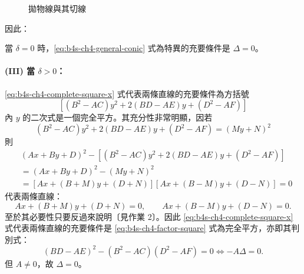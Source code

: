 \begin{figure}[htbp]
\centering
{}
\caption{拋物線與其切線}
\label{fig:b4s-ch4-fig1-2}
\end{figure}

因此：
\begin{proposition}
當 $\delta = 0$ 時，\eqref{eq:b4s-ch4-general-conic} 式為特異的充要條件是 $\Delta = 0$。
\end{proposition}

\paragraph*{(III) 當 $\delta > 0$：}
\eqref{eq:b4s-ch4-complete-square-x} 式代表兩條直線的充要條件為方括號
\[
[(B^2 - AC)y^2 + 2(BD - AE)y + (D^2 - AF)]
\]
內 $y$ 的二次式是一個完全平方。其充分性非常明顯，因若
\begin{equation}
(B^2 - AC)y^2 + 2(BD - AE)y + (D^2 - AF) = (My + N)^2
\label{eq:b4s-ch4-factor-square}
\end{equation}
則
\[
\begin{aligned}
&(Ax + By + D)^2 - [(B^2 - AC)y^2 + 2(BD - AE)y + (D^2 - AF)] \\
&= (Ax + By + D)^2 - (My + N)^2 \\
&= [Ax + (B + M)y + (D + N)][Ax + (B - M)y + (D - N)] = 0
\end{aligned}
\]
代表兩條直線：
\[
Ax + (B + M)y + (D + N) = 0, \qquad
Ax + (B - M)y + (D - N) = 0.
\]
至於其必要性只要反過來說明〔見作業 2〕。因此 \eqref{eq:b4s-ch4-complete-square-x} 式代表兩條直線的充要條件是 \eqref{eq:b4s-ch4-factor-square} 式為完全平方，亦即其判別式：
\[
(BD - AE)^2 - (B^2 - AC)(D^2 - AF) = 0 \iff -A\Delta = 0.
\]
但 $A \ne 0$，故 $\Delta = 0$。

